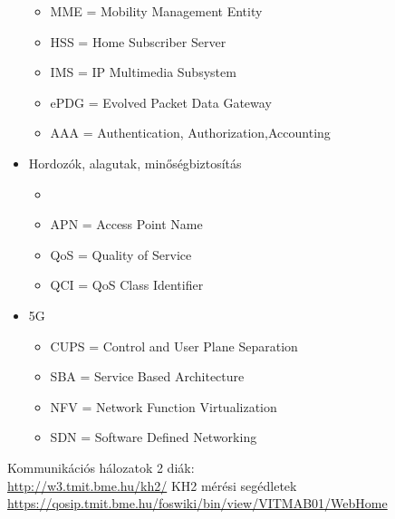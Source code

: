 \documentclass[10pt,a4paper]{article}
\begin{document}
\begin{multicols}{2}
\begin{itemize}
\begin{itemize}
			\item MME = Mobility Management Entity
			\item HSS = Home Subscriber Server
			\item IMS = IP Multimedia Subsystem
			\item ePDG = Evolved Packet Data Gateway
			\item AAA = Authentication, Authorization,Accounting
		\end{itemize}
			\item Hordozók, alagutak, minőségbiztosítás
		\begin{itemize}
			\item \item APN = Access Point Name
			\item QoS = Quality of Service
			\item QCI = QoS Class Identifier
		\end{itemize}
			\item 5G
		\begin{itemize}
			\item CUPS = Control and User Plane Separation
			\item SBA = Service Based Architecture
			\item NFV = Network Function Virtualization
			\item SDN = Software Defined Networking
		\end{itemize}
	\end{itemize}
\end{multicols}
\begin{thebibliography}{9}
	Kommunikációs hálozatok 2 diák:\\
	\url{http://w3.tmit.bme.hu/kh2/}
	KH2 mérési segédletek\\
	\url{https://qosip.tmit.bme.hu/foswiki/bin/view/VITMAB01/WebHome}
\end{thebibliography}
\end{document}
